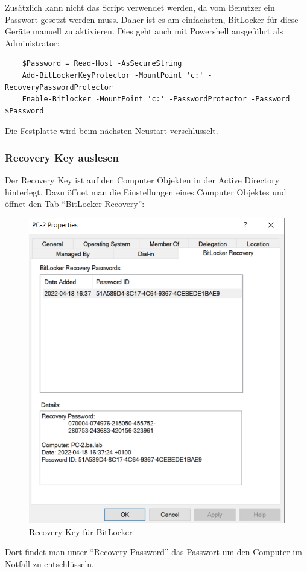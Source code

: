 Zusätzlich kann nicht das Script verwendet werden, da vom Benutzer ein Passwort gesetzt werden muss.
Daher ist es am einfachsten, BitLocker für diese Geräte manuell zu aktivieren.
Dies geht auch mit Powershell ausgeführt als Administrator:
\begin{lstlisting}
    $Password = Read-Host -AsSecureString
    Add-BitLockerKeyProtector -MountPoint 'c:' -RecoveryPasswordProtector
    Enable-Bitlocker -MountPoint 'c:' -PasswordProtector -Password $Password
\end{lstlisting}
Die Festplatte wird beim nächsten Neustart verschlüsselt.


\subsubsection{Recovery Key auslesen}
Der Recovery Key ist auf den Computer Objekten in der Active Directory hinterlegt.
Dazu öffnet man die Einstellungen eines Computer Objektes und öffnet den Tab ``BitLocker Recovery'':
\begin{figure}[H]
    \centering
    \includegraphics[width=\linewidth]{../img/Encryption/bitlocker-recovery.png}
    \caption{Recovery Key für BitLocker}
\end{figure}
Dort findet man unter ``Recovery Password'' das Passwort um den Computer im Notfall zu entschlüsseln.